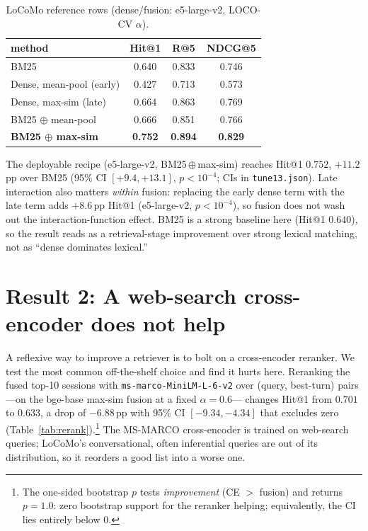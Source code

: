 \documentclass[10pt,twocolumn]{article}
\newcommand{\oxor}{\ensuremath{\oplus}}
\begin{document}
\begin{table}[t]
\centering\small
\caption{LoCoMo reference rows (dense/fusion: e5-large-v2, LOCO-CV $\alpha$).}
\label{tab:headline}
\begin{tabular}{lccc}
\toprule
method & Hit@1 & R@5 & NDCG@5 \\
\midrule
BM25 & 0.640 & 0.833 & 0.746 \\
Dense, mean-pool (early) & 0.427 & 0.713 & 0.573 \\
Dense, max-sim (late) & 0.664 & 0.863 & 0.769 \\
BM25 \oxor{} mean-pool & 0.666 & 0.851 & 0.766 \\
\textbf{BM25 \oxor{} max-sim} & \textbf{0.752} & \textbf{0.894} & \textbf{0.829} \\
\bottomrule
\end{tabular}
\end{table}

The deployable recipe (e5-large-v2, BM25\,\oxor{}\,max-sim) reaches Hit@1
$0.752$, $+11.2$\,pp over BM25 (95\% CI $[+9.4,+13.1]$, $p<10^{-4}$; CIs in
\texttt{tune13.json}). Late interaction also matters \emph{within} fusion:
replacing the early dense term with the late term adds $+8.6$\,pp Hit@1
(e5-large-v2, $p<10^{-4}$), so fusion does not wash out the
interaction-function effect. BM25 is a strong baseline here (Hit@1 $0.640$),
so the result reads as a retrieval-stage improvement over strong lexical
matching, not as ``dense dominates lexical.''

\section{Result 2: A web-search cross-encoder does not help}
\label{sec:rerank}
A reflexive way to improve a retriever is to bolt on a cross-encoder reranker.
We test the most common off-the-shelf choice and find it hurts here. Reranking
the fused top-10 sessions with \texttt{ms-marco-MiniLM-L-6-v2} over (query,
best-turn) pairs---on the bge-base max-sim fusion at a fixed $\alpha{=}0.6$---
changes Hit@1 from $0.701$ to $0.633$, a drop of $-6.88$\,pp with 95\% CI
$[-9.34,-4.34]$ that excludes zero (Table~\ref{tab:rerank}).\footnote{The
one-sided bootstrap $p$ tests \emph{improvement} (CE $>$ fusion) and returns
$p{=}1.0$: zero bootstrap support for the reranker helping; equivalently, the
CI lies entirely below 0.} The MS-MARCO cross-encoder is trained on web-search
queries; LoCoMo's conversational, often inferential queries are out of its
distribution, so it reorders a good list into a worse one.
\end{document}
